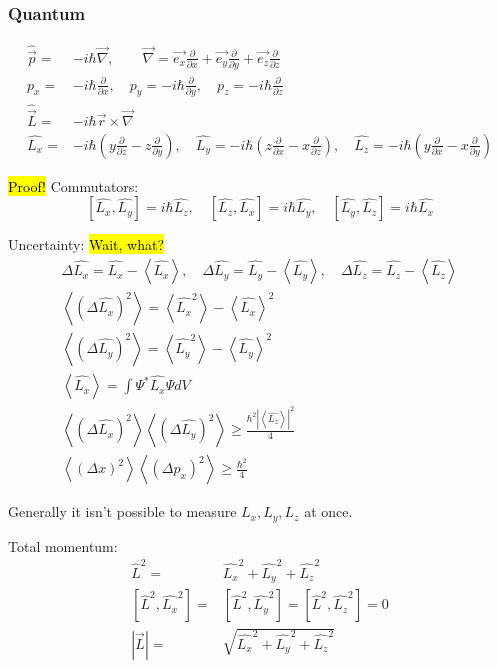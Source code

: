 	\subsubsection{Quantum}
	\begin{align}
		\hat{\vec{p}} =& -i\hbar\vec{\nabla}, \qquad \vec{\nabla} = \vec{e_x}\frac{\partial}{\partial x} + \vec{e_y}\frac{\partial}{\partial y} + \vec{e_z}\frac{\partial}{\partial z} \\
		p_x =& -i\hbar \frac{\partial}{\partial x}, \quad p_y = -i\hbar \frac{\partial}{\partial y}, \quad p_z = -i\hbar \frac{\partial}{\partial z} \\
		\hat{\vec{L}} =& -i\hbar\vec{r}\times\vec{\nabla} \\
		\hat{L_x} =& -i\hbar(y\frac{\partial}{\partial z} - z\frac{\partial}{\partial y}), \quad \hat{L_y} = -i\hbar(z\frac{\partial}{\partial x} - x\frac{\partial}{\partial z}), \quad \hat{L_z} = -i\hbar(y\frac{\partial}{\partial x} - x\frac{\partial}{\partial y}) 
	\end{align}
	
	\hl{Proof!} Commutators:
	\begin{equation}
	\left[\hat{L_x}, \hat{L_y}\right] = i\hbar\hat{L_z}, \quad
	\left[\hat{L_z}, \hat{L_x}\right] = i\hbar\hat{L_y}, \quad
	\left[\hat{L_y}, \hat{L_z}\right] = i\hbar\hat{L_x}
	\end{equation}
	
	Uncertainty: \hl{Wait, what?}
	\begin{align}
		\Delta \hat{L_x} = \hat{L_x} - \left<\hat{L_x} \right>, \quad
		\Delta \hat{L_y} = \hat{L_y} - \left<\hat{L_y} \right>, \quad
		\Delta \hat{L_z} = \hat{L_z} - \left<\hat{L_z} \right> \\
		\left<(\Delta\hat{L_x})^2 \right> = \left<\hat{L_x}^2 \right> - \left<\hat{L_x} \right>^2 \\
		\left<(\Delta\hat{L_y})^2 \right> = \left<\hat{L_y}^2 \right> - \left<\hat{L_y} \right>^2 \\
		\left<\hat{L_x} \right> = \int \Psi^* \hat{L_x} \Psi dV \\ 
		\left<(\Delta\hat{L_x})^2 \right>\left<(\Delta\hat{L_y})^2 \right> \geq \frac{\hbar^2|\left<\hat{L_z}\right>|^2}{4} \\
		\left<(\Delta x)^2 \right>\left<(\Delta p_x)^2 \right> \geq \frac{\hbar^2}{4} \nonumber				
	\end{align}
	
	Generally it isn't possible to measure $L_x, L_y, L_z$ at once. 
	
	Total momentum:
	\begin{align}
		\hat{L}^2 =& \hat{L_x}^2 + \hat{L_y}^2 + \hat{L_z}^2 \\
		\left[\hat{L}^2, \hat{L_x}^2\right] =& \left[\hat{L}^2, \hat{L_y}^2\right] = \left[\hat{L}^2, \hat{L_z}^2\right] = 0 \\
		|\vec{L}| =& \sqrt{\hat{L_x}^2 + \hat{L_y}^2 + \hat{L_z}^2}								
	\end{align}
	
